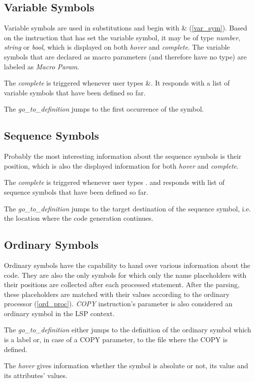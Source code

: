 \subsection{Variable Symbols}

Variable symbols are used in substitutions and begin with \& (\cref{var_sym}). Based on the instruction that has set the variable symbol, it may be of type \emph{number}, \emph{string} or \emph{bool}, which is displayed on both \emph{hover} and \emph{complete}. The variable symbols that are declared as macro parameters (and therefore have no type) are labeled as \emph{Macro Param}.

The \emph{complete} is triggered whenever user types \&. It responds with a list of variable symbols that have been defined so far.

The \emph{go\_to\_definition} jumps to the first occurrence of the symbol.

\subsection{Sequence Symbols}

Probably the most interesting information about the sequence symbols is their position, which is also the displayed information for both \emph{hover} and \emph{complete}.

The \emph{complete} is triggered whenever user types . and responds with list of sequence symbols that have been defined so far.

The \emph{go\_to\_definition} jumps to the target destination of the sequence symbol, i.e. the location where the code generation continues.

\subsection{Ordinary Symbols}

Ordinary symbols have the capability to hand over various information about the code. They are also the only symbols for which only the name placeholders with their positions are collected after each processed statement. After the parsing, these placeholders are matched with their values according to the ordinary processor (\cref{ord_proc}). \emph{COPY} instruction's parameter is also considered an ordinary symbol in the LSP context.  

The \emph{go\_to\_definition} either jumps to the definition of the ordinary symbol which is a label or, in case of a COPY parameter, to the file where the COPY is defined.

The \emph{hover} gives information whether the symbol is absolute or not, its value and its attributes' values. 




